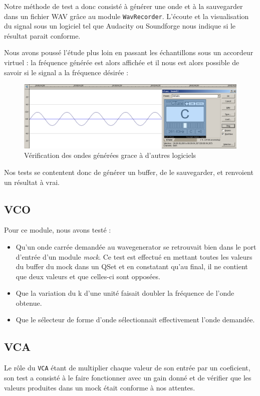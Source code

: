 Notre méthode de test a donc consisté à générer une onde et à la
sauvegarder dans un fichier WAV grâce au module \verb!WavRecorder!.
L'écoute et la visualisation du signal sous un logiciel tel que
Audacity ou Soundforge nous indique si le résultat parait
conforme.

Nous avons poussé l'étude plus loin en passant les échantillons
sous un accordeur virtuel : la fréquence générée est alors affichée
et il nous est alors possible de savoir si le signal a la fréquence
désirée :

\begin{figure}[htb]
\centering
\includegraphics[width=17cm]{../img/png/testWaveGeneratorSinus.png}
\caption{Vérification des ondes générées grace à d'autres logiciels}
\end{figure}

Nos tests se contentent donc de générer un buffer, de le
sauvegarder, et renvoient un résultat à vrai.
\subsection{VCO}
Pour ce module, nous avons testé :
\begin{itemize}
    \item Qu'un onde  carrée demandée au wavegenerator se retrouvait bien dans le port d'entrée d'un module \textit{mock}. Ce test est effectué en mettant toutes les valeurs du buffer du mock dans un QSet et en constatant qu'au final, il ne contient que deux valeurs et que celles-ci sont opposées.
    \item Que la variation du k d'une unité faisait doubler la fréquence de l'onde obtenue.
    \item Que le sélecteur de forme d'onde sélectionnait effectivement l'onde demandée.
\end{itemize}

\subsection{VCA}
Le rôle du \verb!VCA! étant de multiplier chaque valeur de son entrée par un coeficient, son test a consisté à le faire fonctionner avec un gain donné et de vérifier que les valeurs produites dans un mock était conforme à nos attentes.

